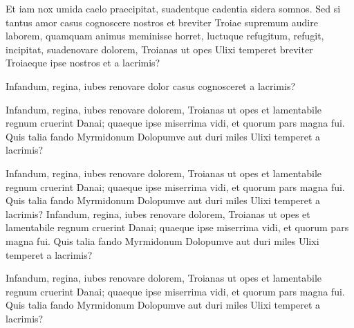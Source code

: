 \documentclass[
   \selectedoptions
  ]
  {aipproc}
\newcommand\doingARLO[2][]{%
  \ifx\mmref\undefined #1\else #2\fi
}
\begin{document}
Et iam nox umida caelo praecipitat, suadentque cadentia sidera
somnos. Sed si tantus amor casus cognoscere nostros et breviter Troiae
supremum audire \cite{Knuth:WEB} laborem, quamquam animus meminisse horret, luctuque
refugitum, refugit, incipitat,
suadenovare dolorem, Troianas ut opes Ulixi temperet breviter
Troiaeque ipse nostros et a lacrimis? 

Infandum, regina, iubes renovare dolor casus cognosceret a lacrimis? 

Infandum, regina, iubes renovare dolorem, Troianas ut opes et
lamentabile regnum cruerint Danai; quaeque ipse miserrima vidi, et
quorum pars magna fui. Quis talia fando Myrmidonum Dolopumve aut duri
miles Ulixi temperet a lacrimis? 

Infandum, regina, iubes renovare dolorem, Troianas ut opes et
lamentabile regnum cruerint \cite{BrownAustin:2000} Danai; quaeque ipse
miserrima vidi, et quorum pars magna fui. Quis talia fando Myrmidonum
Dolopumve aut duri miles Ulixi temperet a lacrimis?  Infandum, regina,
iubes renovare dolorem, Troianas ut opes et lamentabile regnum
cruerint Danai; quaeque ipse miserrima vidi, et quorum pars magna
fui. Quis talia fando Myrmidonum Dolopumve aut duri miles Ulixi
temperet a lacrimis?

\begin{theacknowledgments}
Infandum, regina, iubes renovare dolorem, Troianas ut opes et
lamentabile regnum cruerint Danai; quaeque ipse miserrima vidi, et
quorum pars magna fui. Quis talia fando Myrmidonum Dolopumve aut duri
miles Ulixi temperet a lacrimis? 
\end{theacknowledgments}


\doingARLO[]
          {\ifthenelse{\equal{\AIPcitestyleselect}{num}}
             {}
             {}
          }

\end{document}
